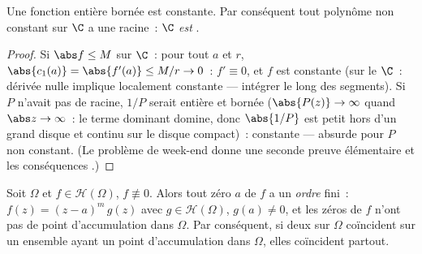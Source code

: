 \begin{corollary}
\label{cor:b3:holomorphic:liouville}
Une fonction entière bornée est constante. Par conséquent tout
polynôme non constant sur $\C$ a une racine~: \emph{$\C$ est
}.
\end{corollary}

\begin{proof}
Si $\abs f \leq M$ sur $\C$~: pour tout $a$ et $r$, $\abs{c_1(a)}
= \abs{f'(a)} \leq M/r \to 0$~: $f' \equiv 0$, et $f$ est
constante (sur le  $\C$~: dérivée nulle implique
localement constante --- intégrer le long des segments). Si $P$
n'avait pas de racine, $1/P$ serait entière et bornée ($\abs{P(z)}
\to \infty$ quand $\abs z \to \infty$~: le terme dominant
domine, donc $\abs{1/P}$ est petit hors d'un grand disque et
continu sur le disque compact)~: constante --- absurde pour $P$
non constant. (Le problème de week-end donne une seconde preuve
élémentaire et les conséquences .)
\end{proof}

\begin{theorem}
\label{thm:b3:holomorphic:identity}
Soit $\Omega$ \emph{} et $f \in \mathcal H(\Omega)$,
$f \not\equiv 0$. Alors tout zéro $a$ de $f$ a un \emph{ordre}
fini~: $f(z) = (z - a)^m\,g(z)$ avec $g \in \mathcal
H(\Omega)$, $g(a) \neq 0$, et les zéros de $f$ n'ont pas de
point d'accumulation dans $\Omega$. Par conséquent, si deux
 sur $\Omega$ coïncident sur un ensemble
ayant un point d'accumulation dans $\Omega$, elles coïncident
partout.
\end{theorem}

